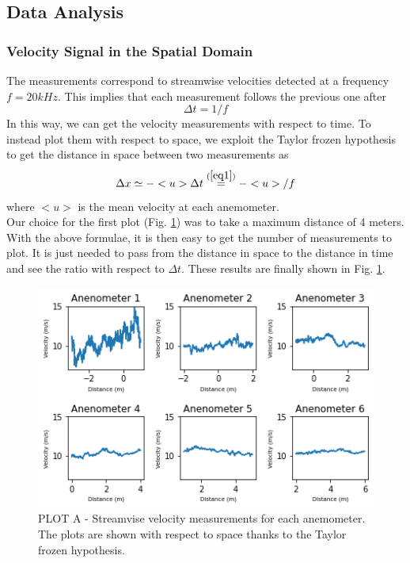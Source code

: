 \documentclass[11pt,titlepage]{article}
\begin{document}
\subsection{Data Analysis}

\subsubsection{Velocity Signal in the Spatial Domain}\label{velocity_signal_in_the_spatial_domain}
The measurements correspond to streamwise velocities detected at a frequency $f=20kHz$. This implies that each measurement follows the previous one after 
\begin{equation} \label{eq1}
\Delta t = 1/f
\end{equation}
In this way, we can get the velocity measurements with respect to time. To instead plot them with respect to space, we exploit the Taylor frozen hypothesis to get the distance in space between two measurements as 
\begin{equation} \label{eq2}
	\Delta x \simeq - <u> \Delta t \overset{(\ref{eq1})}{=} -<u>/f
\end{equation}
	where $<u>$ is the mean velocity at each anemometer. \\ 
Our choice for the first plot (Fig. \ref{fig1}) was to take a maximum distance of 4 meters. With the above formulae, it is then easy to get the number of measurements to plot. It is just needed to pass from the distance in space to the distance in time and see the ratio with respect to $\Delta t$. These results are finally shown in Fig. \ref{fig1}. \\

	\begin{center}
	\begin{figure} [h]
		\centering
		\includegraphics[width = 4.5in]{./figures/ex1_1.png}
		\caption{PLOT A - Streamvise velocity measurements for each anemometer. The plots are shown with respect to space thanks to the Taylor frozen hypothesis.}
		\label{fig1}
	\end{figure}
\end{center}
\end{document}

